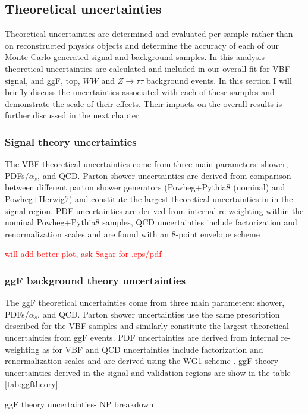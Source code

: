 \subsection{Theoretical uncertainties}
Theoretical uncertainties are determined and evaluated per sample rather than on reconstructed physics objects and determine the accuracy of each of our Monte Carlo generated signal and background samples. In this analysis theoretical uncertainties are calculated and included in our overall fit for VBF signal, and ggF, top, $WW$ and $Z\rightarrow\tau\tau$ background events. In this section I will briefly discuss the uncertainties associated with each of these samples and demonstrate the scale of their effects. Their impacts on the overall results is further discussed in the next chapter. 

\subsubsection{Signal theory uncertainties}
The VBF theoretical uncertainties come from three main parameters: shower, PDFs/$\alpha_s$, and QCD. Parton shower uncertainties are derived from comparison between different parton shower generators (Powheg$+$Pythia8 (nominal) and Powheg$+$Herwig7) and constitute the largest theoretical uncertainties in in the signal region. PDF uncertainties are derived from internal re-weighting within the nominal Powheg$+$Pythia8 samples, QCD uncertainties include factorization and renormalization scales and are found with an 8-point envelope scheme \cite{?} 
 
\textcolor{red}{will add better plot, ask Sagar for .eps/pdf}

\subsubsection{ggF background theory uncertainties}
The ggF theoretical uncertainties come from three main parameters: shower, PDFs/$\alpha_s$, and QCD. Parton shower uncertainties use the same prescription described for the VBF samples and similarly constitute the largest theoretical uncertainties from ggF events. PDF uncertainties are derived from internal re-weighting as for VBF and QCD uncertainties include factorization and renormalization scales and are derived using the WG1 scheme \cite{WG1}. ggF theory uncertainties derived in the signal and validation regions are show in the table \ref{tab:ggftheory}. 

\begin{table}[h!]
\scalebox{0.6}{

}
\caption{ggF theory uncertainties- NP breakdown}
\label{tab:ggftheory}
\end{table}

